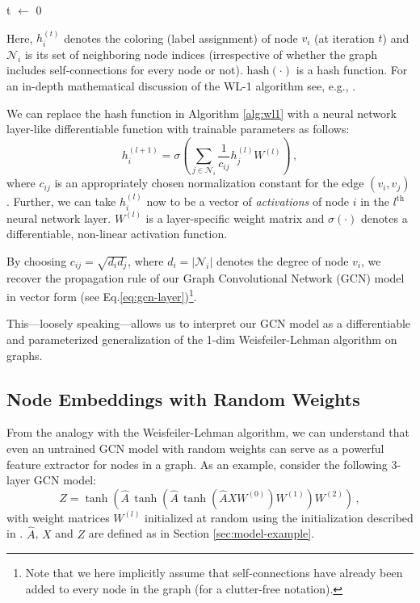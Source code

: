 \documentclass{article} %
\makeatletter
\newcommand*{\eg}{e.g.\@\xspace}
\newcommand*{\eq}{Eq.\@\xspace}
\makeatother
\begin{document}
\begin{algorithm}[H]
t $\leftarrow$ 0\;
    \caption{{\bf WL-1 algorithm \citep{weisfeiler1968reduction}} \label{alg:wl1}}
\end{algorithm}

Here, $h_i^{(t)}$ denotes the coloring (label assignment) of node $v_i$ (at iteration $t$) and $\mathcal{N}_i$ is its set of neighboring node indices (irrespective of whether the graph includes self-connections for every node or not). $\mathrm{hash}(\cdot)$ is a hash function. For an in-depth mathematical discussion of the WL-1 algorithm see, \eg, \cite{douglas2011weisfeiler}.

We can replace the hash function in Algorithm \ref{alg:wl1} with a neural network layer-like differentiable function with trainable parameters as follows:
\begin{equation}
  h^{(l+1)}_i = \sigma \left( \sum_{j\in\mathcal{N}_i} \frac{1}{c_{ij}}h^{(l)}_jW^{(l)} \right) \, ,
\label{eq:diff-model}
\end{equation}
where $c_{ij}$ is an appropriately chosen normalization constant for the edge $(v_i,v_j)$. Further, we can take $h^{(l)}_i$ now to be a vector of \emph{activations} of node $i$ in the $l^{\text{th}}$ neural network layer. $W^{(l)}$ is a layer-specific weight matrix and $\sigma(\cdot)$ denotes a differentiable, non-linear activation function.

By choosing $c_{ij}=\sqrt{d_i d_j}$, where $d_i=|\mathcal{N}_i|$ denotes the degree of node $v_i$, we recover the propagation rule of our Graph Convolutional Network (GCN) model in vector form (see \eq \ref{eq:gcn-layer})\footnote{Note that we here implicitly assume that self-connections have already been added to every node in the graph (for a clutter-free notation).}.

This---loosely speaking---allows us to interpret our GCN model as a differentiable and parameterized generalization of the 1-dim Weisfeiler-Lehman algorithm on graphs.

\subsection{Node Embeddings with Random Weights}
From the analogy with the Weisfeiler-Lehman algorithm, we can understand that even an untrained GCN model with random weights can serve as a powerful feature extractor for nodes in a graph. As an example, consider the following 3-layer GCN model:
\begin{equation}
Z= \tanh\!\left(\hat{A} \, \tanh\!\left(\hat{A}\,\tanh\!\left(\hat{A} X W^{(0)}\right) W^{(1)} \right) W^{(2)} \right) \, ,
\label{eq:three-layer-gcn}
\end{equation}
with weight matrices $W^{(l)}$ initialized at random using the initialization described in \cite{glorot2010understanding}. $\hat{A}$, $X$ and $Z$ are defined as in Section \ref{sec:model-example}.
\end{document}
